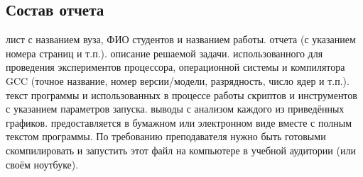 \subsection{Состав отчета}

\begin{enumerate}
     лист с названием вуза, ФИО студентов и названием работы.
     отчета (с указанием номера страниц и т.п.).
     описание решаемой задачи.
     использованного для проведения экспериментов процессора, операционной системы и компилятора GCC (точное название, номер версии/модели, разрядность, число ядер и т.п.).
     текст программы и использованных в процессе работы скриптов и инструментов с указанием параметров запуска.
     выводы с анализом каждого из приведённых графиков.
     предоставляется в бумажном или электронном виде вместе с полным текстом программы. По требованию преподавателя нужно быть готовыми скомпилировать и запустить этот файл на компьютере в учебной аудитории (или своём ноутбуке).
\end{enumerate}
